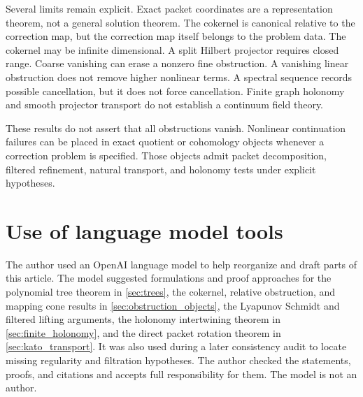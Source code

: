 \documentclass{aomart}
\theoremstyle{definition}
\theoremstyle{remark}
\begin{document}
Several limits remain explicit.  Exact packet coordinates are a representation theorem, not a general solution theorem.  The cokernel is canonical relative to the correction map, but the correction map itself belongs to the problem data.  The cokernel may be infinite dimensional.  A split Hilbert projector requires closed range.  Coarse vanishing can erase a nonzero fine obstruction.  A vanishing linear obstruction does not remove higher nonlinear terms.  A spectral sequence records possible cancellation, but it does not force cancellation.  Finite graph holonomy and smooth projector transport do not establish a continuum field theory.

These results do not assert that all obstructions vanish.  Nonlinear continuation failures can be placed in exact quotient or cohomology objects whenever a correction problem is specified.  Those objects admit packet decomposition, filtered refinement, natural transport, and holonomy tests under explicit hypotheses.

\section*{Use of language model tools}

The author used an OpenAI language model to help reorganize and draft parts of this article.  The model suggested formulations and proof approaches for the polynomial tree theorem in \cref{sec:trees}, the cokernel, relative obstruction, and mapping cone results in \cref{sec:obstruction_objects}, the Lyapunov Schmidt and filtered lifting arguments, the holonomy intertwining theorem in \cref{sec:finite_holonomy}, and the direct packet rotation theorem in \cref{sec:kato_transport}.  It was also used during a later consistency audit to locate missing regularity and filtration hypotheses.  The author checked the statements, proofs, and citations and accepts full responsibility for them.  The model is not an author.



\end{document}
